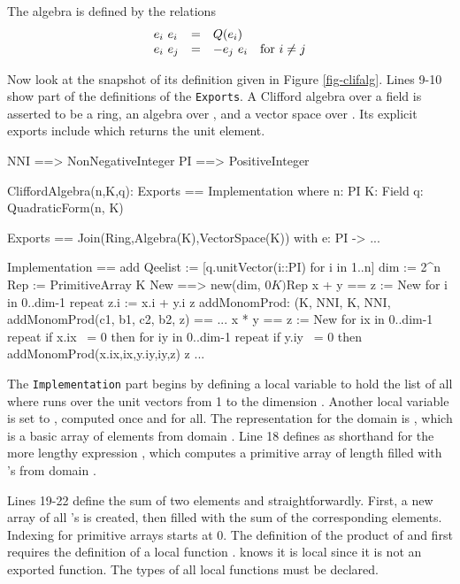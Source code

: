 {{{{{{{The algebra is defined by the relations
$$
\begin{array}{lclc}
e_i \  e_i & = & Q(e_i) \\
e_i \  e_j & = & -e_j \  e_i & \hbox{for } i \neq j
\end{array}
$$

Now look at the snapshot of its definition given in Figure
\ref{fig-clifalg}.
Lines 9-10 show part of the definitions of the {\tt Exports}.
A Clifford algebra over a field  is asserted to be a ring,
an algebra over , and a vector space over .
Its explicit exports include
 which returns the  unit element.

\begin{figXmpLines}[caption={Part of the \textspadtype{CliffordAlgebra} domain.},label={fig-clifalg}]
NNI ==> NonNegativeInteger
PI  ==> PositiveInteger

CliffordAlgebra(n,K,q): Exports == Implementation where
    n: PI
    K: Field
    q: QuadraticForm(n, K)

    Exports == Join(Ring,Algebra(K),VectorSpace(K)) with
      e: PI -> %
          ...

    Implementation == add
      Qeelist :=
        [q.unitVector(i::PI) for i in 1..n]
      dim     :=  2^n
      Rep     := PrimitiveArray K
      New ==> new(dim, 0$K)$Rep
      x + y ==
        z := New
        for i in 0..dim-1 repeat z.i := x.i + y.i
        z
      addMonomProd: (K, NNI, K, NNI, %
      addMonomProd(c1, b1, c2, b2, z) ==  ...
      x * y ==
        z := New
        for ix in 0..dim-1 repeat
          if x.ix ~= 0 then for iy in 0..dim-1 repeat
            if y.iy ~= 0
            then addMonomProd(x.ix,ix,y.iy,iy,z)
          z
           ...
\end{figXmpLines}

The {\tt Implementation} part begins by defining a local variable
 to hold the list of all  where 
runs over the unit vectors from 1 to the dimension .
Another local variable  is set to ,
computed once and for all.
The representation for the domain is
,
which is a basic array of elements from domain .
Line 18 defines  as shorthand for the more lengthy
expression , which computes a primitive
array of length  filled with 's from
domain .

Lines 19-22 define the sum of two elements  and 
straightforwardly.
First, a new array of all 's is created, then filled with
the sum of the corresponding elements.
Indexing for primitive arrays starts at 0.
The definition of the product of  and  first requires
the definition of a local function .
\Language{} knows it is local since it is not an exported function.
The types of all local functions must be declared.

}}}}}}}
